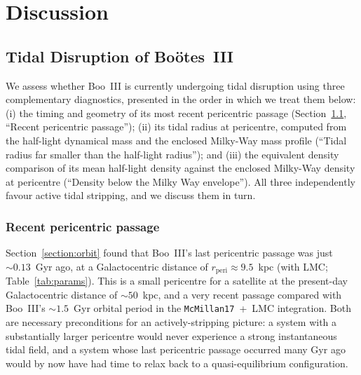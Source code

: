 \documentclass[twocolumn, apj, numberedappendix, appendixfloats]{openjournal_dhayaa}
\begin{document}
\section{Discussion} \label{section:discussion}
\subsection{Tidal Disruption of Boötes~III} \label{section:tidaldisrupt}


We assess whether Boo~III is currently undergoing tidal disruption using three complementary diagnostics, presented in the order in which we treat them below: (i) the timing and geometry of its most recent pericentric passage (Section~\ref{section:tidaldisrupt}, ``Recent pericentric passage''); (ii) its tidal radius at pericentre, computed from the half-light dynamical mass and the enclosed Milky-Way mass profile (``Tidal radius far smaller than the half-light radius''); and (iii) the equivalent density comparison of its mean half-light density against the enclosed Milky-Way density at pericentre (``Density below the Milky Way envelope''). All three independently favour active tidal stripping, and we discuss them in turn.

\subsubsection{Recent pericentric passage} Section~\ref{section:orbit} found that Boo~III's last pericentric passage was just $\sim 0.13$~Gyr ago, at a Galactocentric distance of $r_{\mathrm{peri}} \approx 9.5$~kpc (with LMC; Table~\ref{tab:params}).  This is a small pericentre for a satellite at the present-day Galactocentric distance of $\sim 50$~kpc, and a very recent passage compared with Boo~III's $\sim 1.5$~Gyr orbital period in the \texttt{McMillan17}~+~LMC integration. Both are necessary preconditions for an actively-stripping picture: a system with a substantially larger pericentre would never experience a strong instantaneous tidal field, and a system whose last pericentric passage occurred many Gyr ago would by now have had time to relax back to a quasi-equilibrium configuration.
\end{document}

